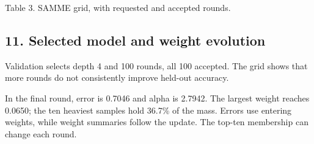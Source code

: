 \documentclass[10pt,twocolumn,letterpaper]{article}
\begin{document}
{\centering
{}
\ifdim\wd\reporttablebox>\columnwidth
\resizebox{\columnwidth}{!}{\usebox{\reporttablebox}}
\else\usebox{\reporttablebox}\fi
\par\small Table 3. SAMME grid, with requested and accepted rounds.
\par}
\vspace{4pt}
\subsection*{11. Selected model and weight evolution}
Validation selects depth 4 and 100 rounds, all 100 accepted. The grid shows that more rounds do not consistently improve held-out accuracy.

In the final round, error is 0.7046 and alpha is 2.7942. The largest weight reaches 0.0650; the ten heaviest samples hold 36.7\% of the mass. Errors use entering weights, while weight summaries follow the update. The top-ten membership can change each round.
\end{document}
